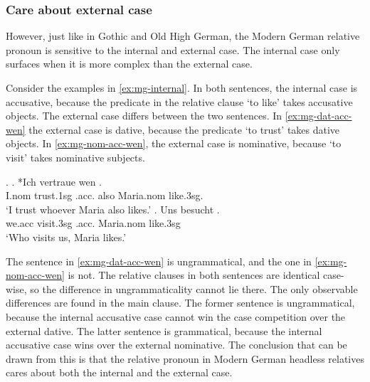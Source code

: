 \subsubsection{Care about external case}

However, just like in Gothic and Old High German, the Modern German relative pronoun is sensitive to the internal and external case.
The internal case only surfaces when it is more complex than the external case.

Consider the examples in \ref{ex:mg-internal}. In both sentences, the internal case is accusative, because the predicate in the relative clause  `to like' takes accusative objects. The external case differs between the two sentences. In \ref{ex:mg-dat-acc-wen} the external case is dative, because the predicate  `to trust' takes dative objects.  In \ref{ex:mg-nom-acc-wen}, the external case is nominative, because  `to visit' takes nominative subjects.

\ex.\label{ex:mg-internal}
\ag. *Ich vertraue wen   . \\
I.\ac{nom} trust.1\ac{sg}\scsub{[dat]} .\ac{acc}. also Maria.\ac{nom} like.3\ac{sg}\scsub{[acc]}.\\
`I trust whoever Maria also likes.' \label{ex:mg-dat-acc-wen}
\bg. Uns besucht   .\\
 we.\ac{acc} visit.3\ac{sg}\scsub{[nom]} .\ac{acc}. Maria.\ac{nom} like.3\ac{sg}\scsub{[acc]}\\
 `Who visits us, Maria likes.' \label{ex:mg-nom-acc-wen}

The sentence in \ref{ex:mg-dat-acc-wen} is ungrammatical, and the one in \ref{ex:mg-nom-acc-wen} is not. The relative clauses in both sentences are identical case-wise, so the difference in ungrammaticality cannot lie there. The only observable differences are found in the main clause. The former sentence is ungrammatical, because the internal accusative case cannot win the case competition over the external dative. The latter sentence is grammatical, because the internal accusative case wins over the external nominative. The conclusion that can be drawn from this is that the relative pronoun in Modern German headless relatives cares about both the internal and the external case.

